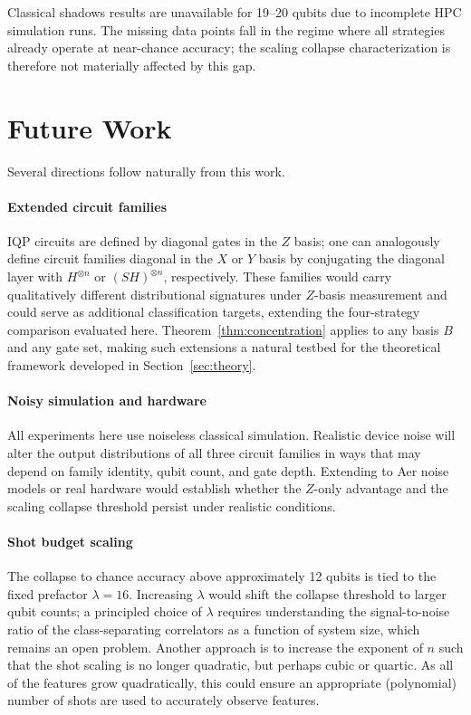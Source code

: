 \documentclass[conference]{IEEEtran}
\newcommand{\nqubits}{n}
\begin{document}
Classical shadows results are unavailable for 19--20 qubits due to incomplete HPC simulation runs.
The missing data points fall in the regime where all strategies already operate at near-chance accuracy; the scaling collapse characterization is therefore not materially affected by this gap.

\section{Future Work}
\label{sec:future}

Several directions follow naturally from this work.

\paragraph{Extended circuit families}
IQP circuits are defined by diagonal gates in the $Z$ basis; one can analogously define circuit families diagonal in the $X$ or $Y$ basis by conjugating the diagonal layer with $H^{\otimes \nqubits}$ or $(SH)^{\otimes \nqubits}$, respectively.
These families would carry qualitatively different distributional signatures under $Z$-basis measurement and could serve as additional classification targets, extending the four-strategy comparison evaluated here.
Theorem~\ref{thm:concentration} applies to any basis $B$ and any gate set, making such extensions a natural testbed for the theoretical framework developed in Section~\ref{sec:theory}.

\paragraph{Noisy simulation and hardware}
All experiments here use noiseless classical simulation.
Realistic device noise will alter the output distributions of all three circuit families in ways that may depend on family identity, qubit count, and gate depth.
Extending to Aer noise models or real hardware would establish whether the $Z$-only advantage and the scaling collapse threshold persist under realistic conditions.

\paragraph{Shot budget scaling}
The collapse to chance accuracy above approximately 12 qubits is tied to the fixed prefactor $\lambda = 16$.
Increasing $\lambda$ would shift the collapse threshold to larger qubit counts; a principled choice of $\lambda$ requires understanding the signal-to-noise ratio of the class-separating correlators as a function of system size, which remains an open problem.
Another approach is to increase the exponent of $\nqubits$ such that the shot scaling is no longer quadratic, but perhaps cubic or quartic. As all of the 
features grow quadratically, this could ensure an appropriate (polynomial) number of shots are used to accurately observe features.
\end{document}
